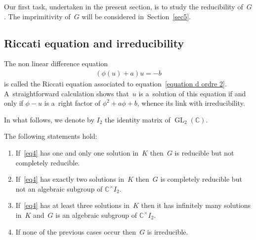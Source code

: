 Our f\/irst task, undertaken in the present section, is to study the reducibility of~$G$.
The imprimitivity of~$G$ will be considered in~Section~\ref{sec5}.

\subsection{Riccati equation and irreducibility}

The non linear dif\/ference equation
\begin{gather}
\label{eq4}
(\phi(u)+a) u=-b
\end{gather}
is called the Riccati equation associated to equation~\eqref{equation d ordre 2}.
A~straightforward calculation shows that~$u$ is a~solution of this equation if and only if $\phi-u$ is a~right factor of
$\phi^{2}+a\phi+b$, whence its link with irreducibility.

In what follows, we denote by $I_{2}$ the identity matrix of $\operatorname{GL}_2(\mathbb C)$.

\begin{Lemma}
\label{lem1}
The following statements hold:
\begin{enumerate}\itemsep=0pt
\item[$1.$] If~\eqref{eq4} has one and only one solution in~$K$ then~$G$ is reducible but not completely reducible.
\item[$2.$] If~\eqref{eq4} has exactly two solutions in~$K$ then~$G$ is completely reducible but not an algebraic subgroup of
$\mathbb C^{\times} I_{2}$.
\item[$3.$] If~\eqref{eq4} has at least three solutions in~$K$ then it has infinitely many solutions in~$K$ and~$G$ is an
algebraic subgroup of $\mathbb C^{\times} I_{2}$.
\item[$4.$] If none of the previous cases occur then~$G$ is irreducible.
\end{enumerate}
\end{Lemma}

